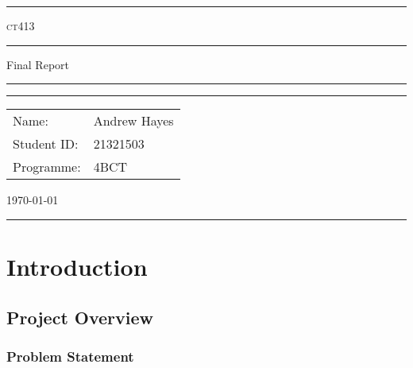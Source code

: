 \documentclass[a4paper,11pt]{article}
\author{Andrew Hayes}
\begin{document}
\begin{titlepage}
    \begin{center}
        \hrule
        \vspace*{0.6cm}
        \Huge \textsc{ct413}
        \vspace*{0.6cm}
        \hrule
        \LARGE
       \vspace{0.5cm}
       Final Report
       \vspace{0.5cm}
       \hrule
       \vfill
       \hrule
        \begin{minipage}{0.495\textwidth} 
            \vspace{0.4em}
            \raggedright
            \normalsize 
            \begin{tabular}{@{}l l}
                Name: & Andrew Hayes \\
                Student ID: & 21321503 \\
                Programme: & 4BCT
            \end{tabular}
        \end{minipage}
        \begin{minipage}{0.495\textwidth} 
            \raggedleft
            \vspace*{0.8cm}
            \Large
            \today
            \vspace*{0.6cm}
        \end{minipage}
        \medskip\hrule 
    \end{center}
\end{titlepage}

\newpage
\tableofcontents
\newpage
\setcounter{page}{1}


\section{Introduction}
\subsection{Project Overview}
\subsubsection{Problem Statement}
\end{document}
